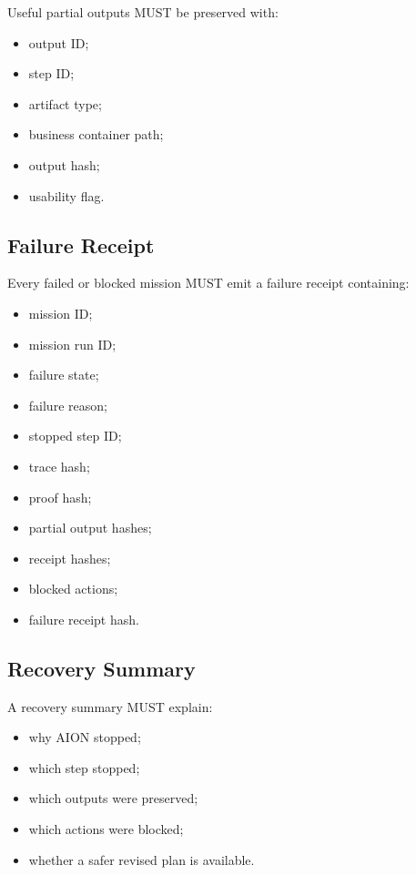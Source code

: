 Useful partial outputs MUST be preserved with:

\begin{itemize}
  \item output ID;
  \item step ID;
  \item artifact type;
  \item business container path;
  \item output hash;
  \item usability flag.
\end{itemize}

\subsection{Failure Receipt}

Every failed or blocked mission MUST emit a failure receipt containing:

\begin{itemize}
  \item mission ID;
  \item mission run ID;
  \item failure state;
  \item failure reason;
  \item stopped step ID;
  \item trace hash;
  \item proof hash;
  \item partial output hashes;
  \item receipt hashes;
  \item blocked actions;
  \item failure receipt hash.
\end{itemize}

\subsection{Recovery Summary}

A recovery summary MUST explain:

\begin{itemize}
  \item why AION stopped;
  \item which step stopped;
  \item which outputs were preserved;
  \item which actions were blocked;
  \item whether a safer revised plan is available.
\end{itemize}

